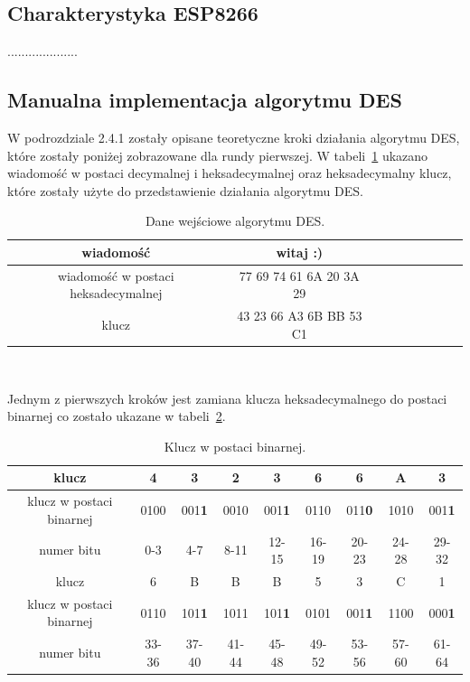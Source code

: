 \documentclass[12p]{article}
\begin{document}
\subsection{Charakterystyka ESP8266}

....................

\subsection{Manualna implementacja algorytmu DES}

\quad W podrozdziale 2.4.1 zostały opisane teoretyczne kroki działania algorytmu DES, które zostały poniżej zobrazowane dla rundy pierwszej. W tabeli~\ref{binary} ukazano wiadomość w postaci decymalnej i heksadecymalnej oraz heksadecymalny klucz, które zostały użyte do przedstawienie działania algorytmu DES. 
 
\begin{table}[H]
\centering
\begin{tabular}{|c|c|c|c|c|c|c|c|c|}
\hline
wiadomość & witaj :)\\
\hline
wiadomość w postaci heksadecymalnej & 77 69 74 61 6A 20 3A 29\\
\hline
klucz & 43 23 66 A3 6B BB 53 C1\\
\hline
\end{tabular}
\caption{Dane wejściowe algorytmu DES.}~\label{binary}
\end{table}

Jednym z pierwszych kroków jest zamiana klucza heksadecymalnego do postaci binarnej co zostało ukazane w tabeli~\ref{klucz_to_binary}.


\begin{table}[H]
\centering
\begin{tabular}{|c|c|c|c|c|c|c|c|c|}
\hline
klucz & 4 & 3 & 2 & 3 & 6 & 6 & A & 3\\
\hline
klucz w postaci binarnej & 0100 & 001\textbf{1} & 0010 & 001\textbf{1} & 0110 & 011\textbf{0} & 1010 & 001\textbf{1}\\ 
\hline
numer bitu & 0-3 & 4-7 & 8-11 & 12-15 & 16-19 & 20-23 & 24-28 & 29-32\\
\hline
\hline
klucz & 6 & B & B & B & 5 & 3 & C & 1\\
\hline
klucz w postaci binarnej & 0110 & 101\textbf{1} & 1011 & 101\textbf{1} & 0101 & 001\textbf{1} & 1100 & 000\textbf{1}\\
\hline
numer bitu & 33-36 & 37-40 & 41-44 & 45-48 & 49-52 & 53-56 & 57-60 & 61-64\\
\hline
\end{tabular}
\caption{Klucz w postaci binarnej.}~\label{klucz_to_binary}
\end{table}
\end{document}
